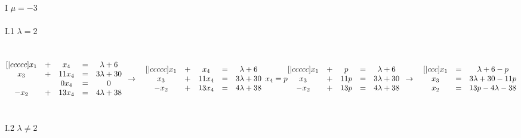 \documentclass{article}
\begin{document}
    \\
    \\
    I \(\mu = -3\)\\
    \\
    I.1 \(\lambda = 2\)\\
    \\
    \\
    \begin{math}
        \begin{matrix}[|ccccc]
            x_1 & + & x_4 & = & \lambda + 6\\
            x_3 & + & 11x_4 & = & 3\lambda + 30\\
            ~ & ~ & 0x_4 & = & 0\\
            -x_2 & + & 13x_4 & = & 4\lambda + 38
        \end{matrix}\\
        \\
        \to\quad
        \begin{matrix}[|ccccc]
            x_1 & + & x_4 & = & \lambda + 6\\
            x_3 & + & 11x_4 & = & 3\lambda + 30\\
            -x_2 & + & 13x_4 & = & 4\lambda + 38
        \end{matrix}\\
        \\
        x_4 = p\\
        \\
        \begin{matrix}[|ccccc]
            x_1 & + & p & = & \lambda + 6\\
            x_3 & + & 11p & = & 3\lambda + 30\\
            -x_2 & + & 13p & = & 4\lambda + 38
        \end{matrix}\\
        \\
        \to\quad
        \begin{matrix}[|ccc]
            x_1 & = & \lambda + 6 - p\\
            x_3 & = & 3\lambda + 30 - 11p\\
            x_2 & = & 13p - 4\lambda - 38
        \end{matrix}
    \end{math}\\
    \\
    \\
    I.2 \(\lambda \neq 2\)\\
    \\
\end{document}
